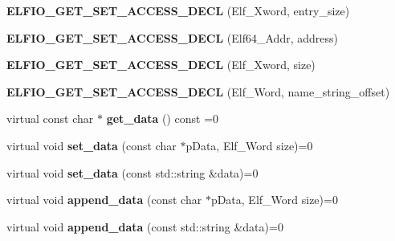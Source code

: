 \begin{DoxyCompactItemize}
\item 
{\bfseries E\+L\+F\+I\+O\+\_\+\+G\+E\+T\+\_\+\+S\+E\+T\+\_\+\+A\+C\+C\+E\+S\+S\+\_\+\+D\+E\+CL} (Elf\+\_\+\+Xword, entry\+\_\+size)\hypertarget{class_e_l_f_i_o_1_1section_a94740bdc591fd145c92e8362d3f63cac}{}\label{class_e_l_f_i_o_1_1section_a94740bdc591fd145c92e8362d3f63cac}

\item 
{\bfseries E\+L\+F\+I\+O\+\_\+\+G\+E\+T\+\_\+\+S\+E\+T\+\_\+\+A\+C\+C\+E\+S\+S\+\_\+\+D\+E\+CL} (Elf64\+\_\+\+Addr, address)\hypertarget{class_e_l_f_i_o_1_1section_a6b91d52a7ae54e828425b699fcc09d7f}{}\label{class_e_l_f_i_o_1_1section_a6b91d52a7ae54e828425b699fcc09d7f}

\item 
{\bfseries E\+L\+F\+I\+O\+\_\+\+G\+E\+T\+\_\+\+S\+E\+T\+\_\+\+A\+C\+C\+E\+S\+S\+\_\+\+D\+E\+CL} (Elf\+\_\+\+Xword, size)\hypertarget{class_e_l_f_i_o_1_1section_aeb28246975187db3ec81393c8c937815}{}\label{class_e_l_f_i_o_1_1section_aeb28246975187db3ec81393c8c937815}

\item 
{\bfseries E\+L\+F\+I\+O\+\_\+\+G\+E\+T\+\_\+\+S\+E\+T\+\_\+\+A\+C\+C\+E\+S\+S\+\_\+\+D\+E\+CL} (Elf\+\_\+\+Word, name\+\_\+string\+\_\+offset)\hypertarget{class_e_l_f_i_o_1_1section_aee5471d7dd3a92896a9162cbfb5b6aae}{}\label{class_e_l_f_i_o_1_1section_aee5471d7dd3a92896a9162cbfb5b6aae}

\item 
virtual const char $\ast$ {\bfseries get\+\_\+data} () const =0\hypertarget{class_e_l_f_i_o_1_1section_accfaef20485ee803990b260130022bd2}{}\label{class_e_l_f_i_o_1_1section_accfaef20485ee803990b260130022bd2}

\item 
virtual void {\bfseries set\+\_\+data} (const char $\ast$p\+Data, Elf\+\_\+\+Word size)=0\hypertarget{class_e_l_f_i_o_1_1section_a31362981c3399229d59ec8c3a51cb662}{}\label{class_e_l_f_i_o_1_1section_a31362981c3399229d59ec8c3a51cb662}

\item 
virtual void {\bfseries set\+\_\+data} (const std\+::string \&data)=0\hypertarget{class_e_l_f_i_o_1_1section_ab69d06eb3ea000b23e6894d4cc9a184a}{}\label{class_e_l_f_i_o_1_1section_ab69d06eb3ea000b23e6894d4cc9a184a}

\item 
virtual void {\bfseries append\+\_\+data} (const char $\ast$p\+Data, Elf\+\_\+\+Word size)=0\hypertarget{class_e_l_f_i_o_1_1section_a46ee8988d3120629f0861e54f3fa5aa3}{}\label{class_e_l_f_i_o_1_1section_a46ee8988d3120629f0861e54f3fa5aa3}

\item 
virtual void {\bfseries append\+\_\+data} (const std\+::string \&data)=0\hypertarget{class_e_l_f_i_o_1_1section_ad65a05cce15e60fc33f61b551943bc0b}{}\label{class_e_l_f_i_o_1_1section_ad65a05cce15e60fc33f61b551943bc0b}

\end{DoxyCompactItemize}
